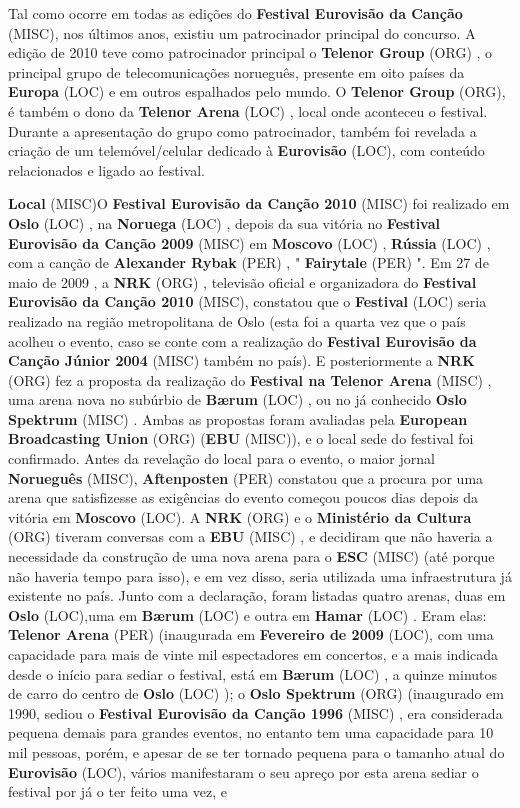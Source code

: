 \documentclass[12pt,a4paper]{article}
\begin{document}
Tal como ocorre em todas as edições do \textbf{Festival Eurovisão da Canção} (MISC), nos últimos anos, existiu um patrocinador principal do concurso. A edição de 2010 teve como patrocinador principal o \textbf{Telenor Group} (ORG) , o principal grupo de telecomunicações norueguês, presente em oito países da \textbf{Europa} (LOC) e em outros espalhados pelo mundo. O \textbf{Telenor Group} (ORG), é também o dono da \textbf{Telenor Arena} (LOC) , local onde aconteceu o festival. Durante a apresentação do grupo como patrocinador, também foi revelada a criação de um telemóvel/celular dedicado à \textbf{Eurovisão} (LOC), com conteúdo relacionados e ligado ao festival.



\textbf{Local} (MISC)O \textbf{Festival Eurovisão da Canção 2010} (MISC) foi realizado em \textbf{Oslo} (LOC) , na \textbf{Noruega} (LOC) , depois da sua vitória no \textbf{Festival Eurovisão da Canção 2009} (MISC) em \textbf{Moscovo} (LOC) , \textbf{Rússia} (LOC) , com a canção de \textbf{Alexander Rybak} (PER) , " \textbf{Fairytale} (PER) ". Em 27 de maio de 2009 , a \textbf{NRK} (ORG) , televisão oficial e organizadora do \textbf{Festival Eurovisão da Canção 2010} (MISC), constatou que o \textbf{Festival} (LOC) seria realizado na região metropolitana de Oslo (esta foi a quarta vez que o país acolheu o evento, caso se conte com a realização do \textbf{Festival Eurovisão da Canção Júnior 2004} (MISC) também no país). E posteriormente a \textbf{NRK} (ORG) fez a proposta da realização do \textbf{Festival na Telenor Arena} (MISC) , uma arena nova no subúrbio de \textbf{Bærum} (LOC) , ou no já conhecido \textbf{Oslo Spektrum} (MISC) . Ambas as propostas foram avaliadas pela \textbf{European Broadcasting Union} (ORG) (\textbf{EBU} (MISC)), e o local sede do festival foi confirmado. Antes da revelação do local para o evento, o maior jornal \textbf{Norueguês} (MISC), \textbf{Aftenposten} (PER) constatou que a procura por uma arena que satisfizesse as exigências do evento começou poucos dias depois da vitória em \textbf{Moscovo} (LOC). A \textbf{NRK} (ORG) e o \textbf{Ministério da Cultura} (ORG) tiveram conversas com a \textbf{EBU} (MISC) , e decidiram que não haveria a necessidade da construção de uma nova arena para o \textbf{ESC} (MISC) (até porque não haveria tempo para isso), e em vez disso, seria utilizada uma infraestrutura já existente no país. Junto com a declaração, foram listadas quatro arenas, duas em \textbf{Oslo} (LOC),uma em \textbf{Bærum} (LOC) e outra em \textbf{Hamar} (LOC) . Eram elas: \textbf{Telenor Arena} (PER) (inaugurada em \textbf{Fevereiro de 2009} (LOC), com uma capacidade para mais de vinte mil espectadores em concertos, e a mais indicada desde o início para sediar o festival, está em \textbf{Bærum} (LOC) , a quinze minutos de carro do centro de \textbf{Oslo} (LOC) ); o \textbf{Oslo Spektrum} (ORG) (inaugurado em 1990, sediou o \textbf{Festival Eurovisão da Canção 1996} (MISC) , era considerada pequena demais para grandes eventos, no entanto tem uma capacidade para 10 mil pessoas, porém, e apesar de se ter tornado pequena para o tamanho atual do \textbf{Eurovisão} (LOC), vários manifestaram o seu apreço por esta arena sediar o festival por já o ter feito uma vez, e 
\end{document}
